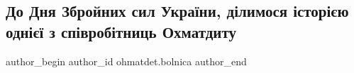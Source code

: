  
 
 
 
 
 
\subsection{До Дня Збройних сил України, ділимося історією однієї з співробітниць Охматдиту}
\label{sec:06_12_2022.fb.ohmatdet.bolnica.1.istoria_zsu}
 
\ifcmt
 author_begin
   author_id ohmatdet.bolnica
 author_end
\fi
